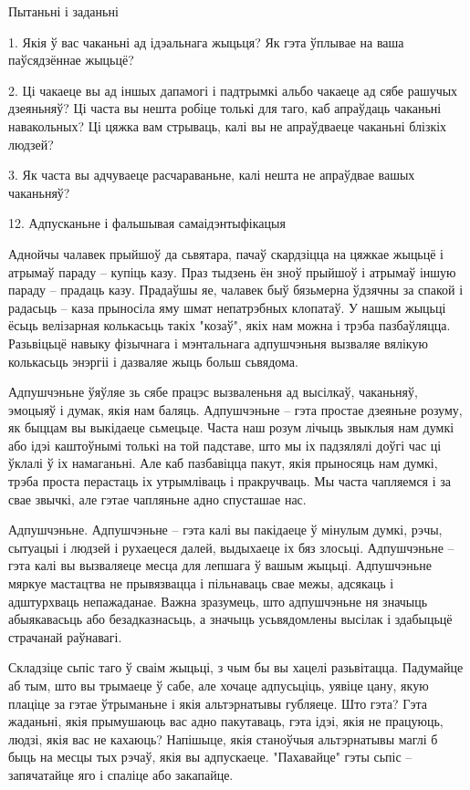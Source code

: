 Пытаньні і заданьні

1. Якія ў вас чаканьні ад ідэальнага жыцьця? Як гэта ўплывае на ваша паўсядзённае жыцьцё?

2. Ці чакаеце вы ад іншых дапамогі і падтрымкі альбо чакаеце ад сябе рашучых дзеяньняў? Ці часта вы нешта робіце толькі для таго, каб апраўдаць чаканьні навакольных? Ці цяжка вам стрываць, калі вы не апраўдваеце чаканьні блізкіх людзей?

3. Як часта вы адчуваеце расчараваньне, калі нешта не апраўдвае вашых чаканьняў?


12. Адпусканьне і фальшывая самаідэнтыфікацыя

Аднойчы чалавек прыйшоў да сьвятара, пачаў скардзіцца на цяжкае жыцьцё і атрымаў параду – купіць казу. Праз тыдзень ён зноў прыйшоў і атрымаў іншую параду – прадаць казу. Прадаўшы яе, чалавек быў бязьмерна ўдзячны за спакой і радасьць – каза прыносіла яму шмат непатрэбных клопатаў. У нашым жыцьці ёсьць велізарная колькасьць такіх "козаў", якіх нам можна і трэба пазбаўляцца. Разьвіцьцё навыку фізычнага і мэнтальнага адпушчэньня вызваляе вялікую колькасьць энэргіі і дазваляе жыць больш сьвядома.

Адпушчэньне ўяўляе зь сябе працэс вызваленьня ад высілкаў, чаканьняў, эмоцыяў і думак, якія нам баляць. Адпушчэньне – гэта простае дзеяньне розуму, як быццам вы выкідаеце сьмецьце. Часта наш розум лічыць звыклыя нам думкі або ідэі каштоўнымі толькі на той падставе, што мы іх падзялялі доўгі час ці ўклалі ў іх намаганьні. Але каб пазбавіцца пакут, якія прыносяць нам думкі, трэба проста перастаць іх утрымліваць і пракручваць. Мы часта чапляемся і за свае звычкі, але гэтае чапляньне адно спусташае нас.

Адпушчэньне. Адпушчэньне – гэта калі вы пакідаеце ў мінулым думкі, рэчы, сытуацыі і людзей і рухаецеся далей, выдыхаеце іх бяз злосьці. Адпушчэньне – гэта калі вы вызваляеце месца для лепшага ў вашым жыцьці. Адпушчэньне мяркуе мастацтва не прывязвацца і пільнаваць свае межы, адсякаць і адштурхваць непажаданае. Важна зразумець, што адпушчэньне ня значыць абыякавасьць або безадказнасьць, а значыць усьвядомлены высілак і здабыцьцё страчанай раўнавагі.

Складзіце сьпіс таго ў сваім жыцьці, з чым бы вы хацелі разьвітацца. Падумайце аб тым, што вы трымаеце ў сабе, але хочаце адпусьціць, уявіце цану, якую плаціце за гэтае ўтрыманьне і якія альтэрнатывы губляеце. Што гэта? Гэта жаданьні, якія прымушаюць вас адно пакутаваць, гэта ідэі, якія не працуюць, людзі, якія вас не кахаюць? Напішыце, якія станоўчыя альтэрнатывы маглі б быць на месцы тых рэчаў, якія вы адпускаеце. "Пахавайце" гэты сьпіс – запячатайце яго і спаліце або закапайце.

